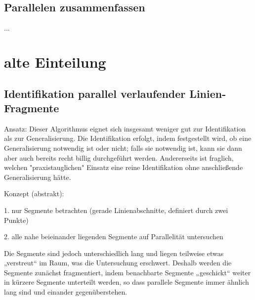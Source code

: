 \documentclass[../main/thesis.tex]{subfiles}
\begin{document}
\subsection{Parallelen zusammenfassen}

%

...




\section{alte Einteilung}

\subsection{Identifikation parallel verlaufender Linien-Fragmente}

Ansatz: Dieser Algorithmus eignet sich insgesamt weniger gut zur Identifikation als zur Generalisierung.
Die Identifikation erfolgt, indem festgestellt wird, ob eine Generalisierung notwendig ist oder nicht; falls sie notwendig ist, kann sie dann aber auch bereits recht billig durchgeführt werden.
Andererseits ist fraglich, welchen "praxistauglichen" Einsatz eine reine Identifikation ohne anschließende Generalisierung hätte.

Konzept (abstrakt):

1. nur Segmente betrachten (gerade Linienabschnitte, definiert durch zwei Punkte)

2. alle nahe beieinander liegenden Segmente auf Parallelität untersuchen

Die Segmente sind jedoch unterschiedlich lang und liegen teilweise etwas „verstreut“ im Raum, was die Untersuchung erschwert.
Deshalb werden die Segmente zunächst fragmentiert, indem benachbarte Segmente „geschickt“ weiter in kürzere Segmente unterteilt werden, so dass parallele Segmente immer ähnlich lang sind und einander gegenüberstehen.
\end{document}
